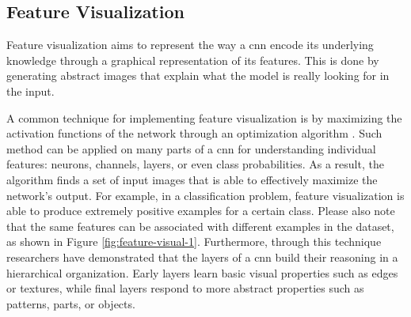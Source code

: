 \subsection{Feature Visualization}
\label{subsec:feature-vis}


Feature visualization aims to represent the way a \gls{cnn} encode its underlying knowledge through a graphical representation of its features. This is done by generating abstract images that explain what the model is really looking for in the input. 

A common technique for implementing feature visualization is by maximizing the activation functions of the network through an optimization algorithm \cite{erhan2009feature} \cite{nguyen2016multifaceted}. Such method can be applied on many parts of a \gls{cnn} for understanding individual features: neurons, channels, layers, or even class probabilities. As a result, the algorithm finds a set of input images that is able to effectively maximize the network's output. For example, in a classification problem, feature visualization is able to produce extremely positive examples for a certain class. Please also note that the same features can be associated with different examples in the dataset, as shown in Figure \ref{fig:feature-visual-1}. Furthermore, through this technique researchers have demonstrated \cite{olah2017feature} that the layers of a \gls{cnn} build their reasoning in a hierarchical organization. Early layers learn basic visual properties such as edges or textures, while final layers respond to more abstract properties such as patterns, parts, or objects.

